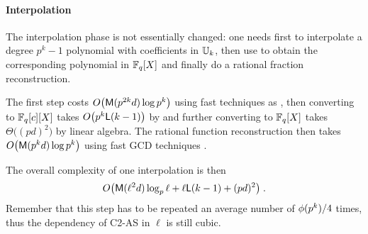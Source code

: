 \paragraph{Interpolation}
The interpolation phase is not essentially changed: one needs first to
interpolate a degree $p^k-1$ polynomial with coefficients in $\mathbb{U}_k$,
then use \cite[]{DFS09} to obtain the corresponding
polynomial in $\mathbb{F}_q[X]$ and finally do a rational fraction
reconstruction.

The first step costs $O\bigl(\mathrm{\sf M}(p^{2k}d)\log p^k\bigr)$ using fast techniques
as \cite[$\S$10.2]{vzGG}, then converting to $\mathbb{F}_q[c][X]$ takes
$O\bigl(p^k{\sf L}(k-1)\bigr)$ by \cite{DFS09} and further converting to
$\mathbb{F}_q[X]$ takes $\Theta\bigl((pd)^2\bigr)$ by linear algebra. The rational function
reconstruction then takes $O\bigl(\mathrm{\sf M}(p^kd)\log p^k\bigr)$ using
fast GCD techniques \cite[$\S$11.1]{vzGG}.

The overall complexity of one interpolation is then
\begin{equation}
  \label{eq:C2-AS:complexity:interp}
  O\bigl(\mathrm{\sf M}(\ell^2d)\log_p\ell + \ell{\sf L}(k-1) + (pd)^2\bigr)
  \;\text{.}
\end{equation}
Remember that this step has to be repeated an average number of
$\phi(p^k)/4$ times, thus the dependency of C2-AS in $\ell$ is still cubic.



%
